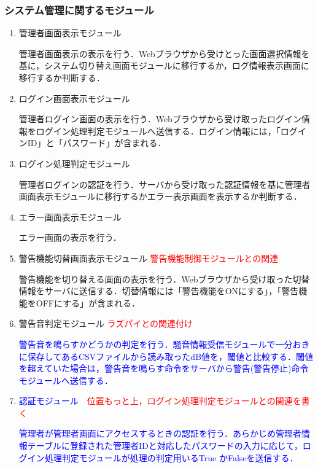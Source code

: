 \subsubsection{システム管理に関するモジュール}
\begin{enumerate}
\renewcommand{\labelenumi}{(\arabic{enumi})}

\item 管理者画面表示モジュール

管理者画面表示の表示を行う．Webブラウザから受けとった画面選択情報を基に，システム切り替え画面モジュールに移行するか，ログ情報表示画面に移行するか判断する．

\item ログイン画面表示モジュール 

管理者ログイン画面の表示を行う．Webブラウザから受け取ったログイン情報をログイン処理判定モジュールへ送信する．ログイン情報には，「ログインID」と「パスワード」が含まれる．

\item ログイン処理判定モジュール 

管理者ログインの認証を行う．サーバから受け取った認証情報を基に管理者画面表示モジュールに移行するかエラー表示画面を表示するか判断する．

\item エラー画面表示モジュール 

エラー画面の表示を行う．

\item 警告機能切替画面表示モジュール 	\textcolor{red}{警告機能制御モジュールとの関連}

警告機能を切り替える画面の表示を行う．Webブラウザから受け取った切替情報をサーバに送信する．切替情報には「警告機能をONにする」，「警告機能をOFFにする」が含まれる．

\item 警告音判定モジュール \textcolor{red}{ラズパイとの関連付け}

\textcolor{blue}{警告音を鳴らすかどうかの判定を行う．騒音情報受信モジュールで一分おきに保存してあるCSVファイルから読み取ったdB値を，閾値と比較する．閾値を超えていた場合は，警告音を鳴らす命令をサーバから警告(警告停止)命令モジュールへ送信する．}

\item \textcolor{blue}{認証モジュール}　\textcolor{red}{位置もっと上，ログイン処理判定モジュールとの関連を書く}

\textcolor{blue}{管理者が管理者画面にアクセスするときの認証を行う．あらかじめ管理者情報テーブルに登録された管理者IDと対応したパスワードの入力に応じて，ログイン処理判定モジュールが処理の判定用いるTrue かFalseを送信する．}


\end{enumerate}
